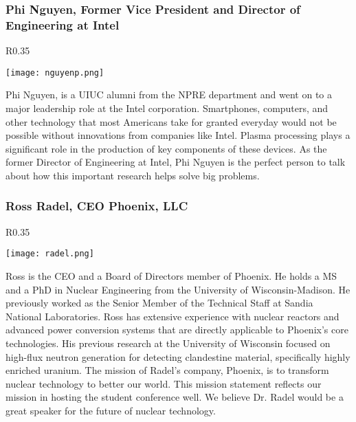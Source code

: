 \subsubsection{Phi Nguyen, Former Vice President and Director of Engineering at Intel}
\setlength\intextsep{0pt}
\begin{wrapfigure}{R}{0.35\textwidth}
	\begin{center}
		\vspace{-\baselineskip}
		\texttt{[image: nguyenp.png]}
	\end{center}
\end{wrapfigure}
Phi Nguyen, is a UIUC alumni from the NPRE department and went on to a major leadership role at the Intel corporation. Smartphones, computers, and other technology that most Americans take for granted everyday would not be possible without innovations from companies like Intel. Plasma processing plays a significant role in the production of key components of these devices. As the former Director of Engineering at Intel, Phi Nguyen is the perfect person to talk about how this important research helps solve big problems. 
\clearpage
\subsubsection{Ross Radel, CEO Phoenix, LLC}
\setlength\intextsep{0pt}
\begin{wrapfigure}{R}{0.35\textwidth}
	\begin{center}
		\vspace{-\baselineskip}
		\texttt{[image: radel.png]}
	\end{center}
\end{wrapfigure}
Ross is the CEO and a Board of Directors member of Phoenix. He holds a MS and a PhD in Nuclear Engineering from the University of Wisconsin-Madison. He previously worked as the Senior Member of the Technical Staff at Sandia National Laboratories. Ross has extensive experience with nuclear reactors and advanced power conversion systems that are directly applicable to Phoenix’s core technologies. His previous research at the University of Wisconsin focused on high-flux neutron generation for detecting clandestine material, specifically highly enriched uranium. The mission of Radel's company, Phoenix, is to transform nuclear technology to better our world. This mission statement reflects our mission in hosting the student conference well. We believe Dr. Radel would be a great speaker for the future of nuclear technology.\\


